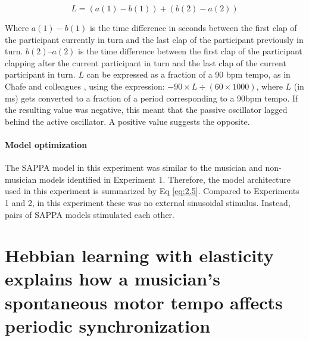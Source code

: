 \documentclass{report}
\begin{document}
\begin{equation}
L = (a(1) - b(1)) + (b(2) - a(2)) \label{eq:2.9}
\end{equation}

Where $a(1)- b(1)$ is the time difference in seconds between the first clap of the participant currently in turn and the last clap of the participant previously in turn. $b(2)–a(2)$ is the time difference between the first clap of the participant clapping after the current participant in turn and the last clap of the current participant in turn. $L$ can be expressed as a fraction of a 90 bpm tempo, as in Chafe and colleagues \cite{chafe2010effect}, using the expression: $- 90 \times L \div (60 \times 1000)$, where $L$ (in ms) gets converted to a fraction of a period corresponding to a 90bpm tempo. If the resulting value was negative, this meant that the passive oscillator lagged behind the active oscillator. A positive value suggests the opposite.

\subsubsection{Model optimization}

The SAPPA model in this experiment was similar to the musician and non-musician models identified in Experiment 1. Therefore, the model architecture used in this experiment is summarized by Eq \eqref{eq:2.5}. Compared to Experiments 1 and 2, in this experiment these was no external sinusoidal stimulus. Instead, pairs of SAPPA models stimulated each other.

\chapter{Hebbian learning with elasticity explains how a musician's spontaneous motor tempo affects periodic synchronization}
\end{document}

